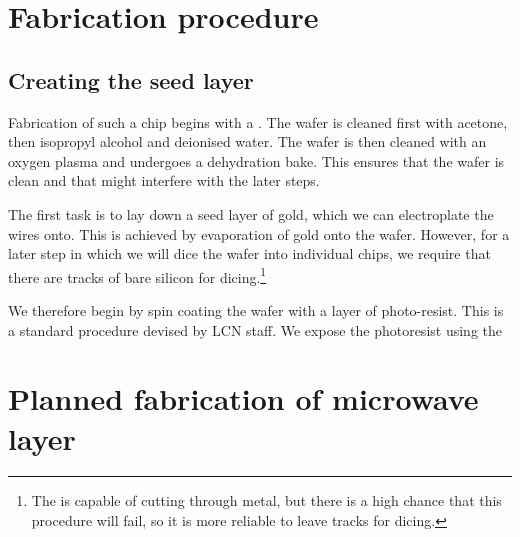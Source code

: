 \section{Fabrication procedure}
\label{fab:procedure}


\subsection{Creating the seed layer}

Fabrication of such a chip begins with a . The wafer
is cleaned first with acetone, then isopropyl alcohol and deionised water. The
wafer is then cleaned with an oxygen plasma and undergoes a dehydration bake.
This ensures that the wafer is clean and  that
might interfere with the later steps.

The first task is to lay down a seed layer of gold, which we can electroplate
the wires onto. This is achieved by evaporation of gold onto the wafer.
However, for a later step in which we will dice the wafer into individual
chips, we require that there are tracks of bare silicon for
dicing.\footnote{The  is capable of cutting through metal, but
there is a high chance that this procedure will fail, so it is more reliable to
leave tracks for dicing.}

We therefore begin by spin coating the wafer with a  layer
of  photo-resist. This is a standard procedure devised by LCN staff.
 We expose the photoresist using the 


\section{Planned fabrication of microwave layer}
\label{fab:planned}

